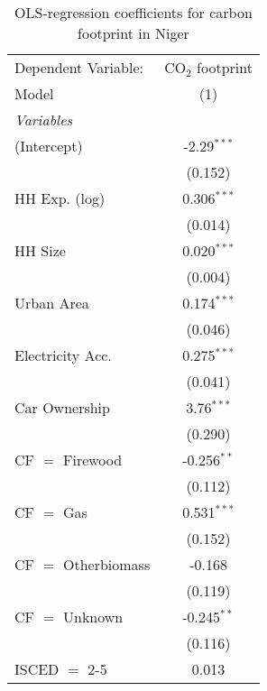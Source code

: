
\begin{table}[htbp!]
   \centering
   \small
   \begin{adjustbox}{width = 1\textwidth, max height = 0.95\textheight, center}
      \begin{threeparttable}[b]
         \caption{\label{tab:OLS_2_NER} OLS-regression coefficients for carbon footprint in Niger}
         \begin{tabular}{lc}
            \tabularnewline \midrule \midrule
            Dependent Variable: & CO$_{2}$ footprint\\  
            Model               & (1)\\  
            \midrule
            \emph{Variables}\\
            (Intercept)         & -2.29$^{***}$\\   
                                & (0.152)\\   
            HH Exp. (log)       & 0.306$^{***}$\\   
                                & (0.014)\\   
            HH Size             & 0.020$^{***}$\\   
                                & (0.004)\\   
            Urban Area          & 0.174$^{***}$\\   
                                & (0.046)\\   
            Electricity Acc.    & 0.275$^{***}$\\   
                                & (0.041)\\   
            Car Ownership       & 3.76$^{***}$\\   
                                & (0.290)\\   
            CF $=$ Firewood     & -0.256$^{**}$\\   
                                & (0.112)\\   
            CF $=$ Gas          & 0.531$^{***}$\\   
                                & (0.152)\\   
            CF $=$ Otherbiomass & -0.168\\   
                                & (0.119)\\   
            CF $=$ Unknown      & -0.245$^{**}$\\   
                                & (0.116)\\   
            ISCED $=$ 2-5       & 0.013\\   

\end{tabular}
\end{threeparttable}
\end{adjustbox}
\end{table}
